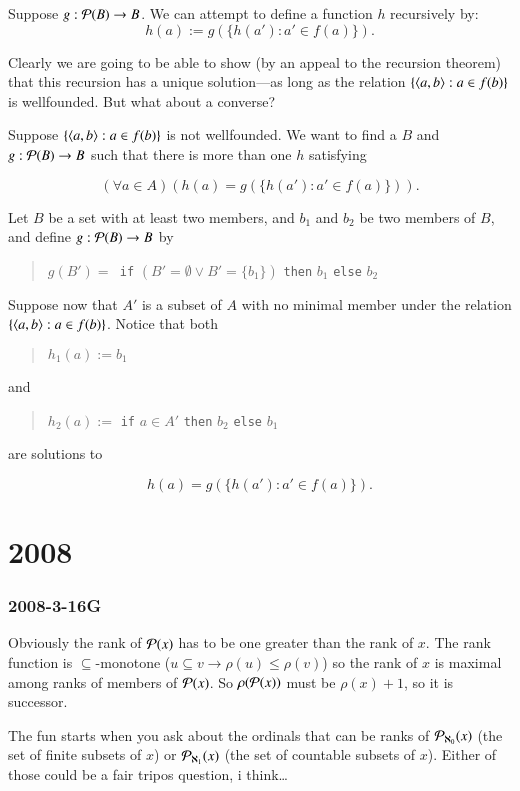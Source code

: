 \documentclass{book}
\begin{document}
Suppose $g:{\cal P}(B) \to B$.  We can attempt to define 
a function $h$ recursively by:
$$h(a) := g(\{h(a'): a' \in f(a)\}).$$

Clearly we are going to be able to show (by an appeal to the recursion
theorem) that this recursion has a unique solution---as long as the
relation $\{\mbox{$\langle a,b \rangle$}: a \in f(b)\}$ is wellfounded.  But what about
a converse?

Suppose $\{\mbox{$\langle a,b \rangle$}: a \in f(b)\}$ is not wellfounded. We want to
find a $B$ and $g:{\cal P}(B) \to B$ such that there is more than one
$h$ satisfying

$$(\forall a \in A)(h(a) = g(\{h(a'): a' \in f(a)\})).$$

Let $B$ be a set with at least two members, and $b_1$ and $b_2$ be two
members of $B$, and define $g:{\cal P}(B) \to B$ by \begin{quote}
  $g(B') = $\verb# if# $(B' = \emptyset \vee B' = \{b_1\})$ \verb#then#
  $b_1$ \verb#else# $b_2$\end{quote}

Suppose now that $A'$ is a subset of $A$ with no minimal member under the
relation $\{\mbox{$\langle a,b \rangle$}: a \in f(b)\}$.  Notice that both
\begin{quote}
$h_1(a) := b_1$\end{quote}
and
\begin{quote}
  $h_2(a) := $ \verb#if# $a \in A'$ \verb#then# $b_2$ \verb#else# $b_1$
\end{quote}

are solutions to 

$$h(a) = g(\{h(a'): a' \in f(a)\}).$$


\chapter{2008}
\subsection*{2008-3-16G}
Obviously the rank of ${\cal P}(x)$ has to be one greater than the
rank of $x$.  The rank function is $\subseteq$-monotone ($u \subseteq
v \to \rho(u) \leq \rho(v)$) so the rank of $x$ is maximal among ranks
of members of ${\cal P}(x)$.  So $\rho({\cal P}(x))$ must be $\rho(x)
+ 1$, so it is successor.

\medskip

The fun starts when you ask about the ordinals that can be ranks of
${\cal P}_{\aleph_0}(x)$ (the set of finite subsets of $x$)
or ${\cal P}_{\aleph_1}(x)$ (the set of countable subsets of $x$).
Either of those could be a fair tripos question, i think\ldots
\end{document}
